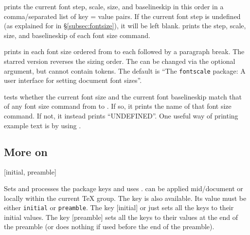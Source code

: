\documentclass{beery}
\begin{document}
\nopagebreak\newline
{}

 prints the current font step, scale, size, and baselineskip in this order in a comma\-/separated list of key = value pairs.
If the current font step is undefined (as explained for  in \S\ref{subsec:fontsize}), it will be left blank.
 prints the step, scale, size, and baselineskip of each font size command.

\nopagebreak\newline
{}

 prints  in each font size ordered from  to  each followed by a paragraph break.
The starred version  reverses the sizing order.
The  can be changed via the optional argument, but cannot contain  tokens.
The default  is \enquote{The \texttt{fontscale} package: A user interface for setting document font sizes}.

\KeepNextPar*

 tests whether the current font size and the current font baselineskip match that of any font size command from  to .
If so, it prints the name of that font size command.
If not, it instead prints \enquote{UNDEFINED\@}.
One useful way of printing example text is by using
.
\vfill%

\subsection
  {%
    \texorpdfstring
      {More on }
      {More on \textbackslash{}fontscalesetup}%
  }
\label{subsec:fontscalesetup}

\nopagebreak\newline
{}[initial, preamble]

Sets and processes the  package keys and uses .
 can be applied mid\-/document or locally within the current \TeX{} group.
The key  is also available.
Its value must be either \texttt{initial} or \texttt{preamble}.
The key [initial] or just  sets all the keys to their initial values.
The key [preamble] sets all the keys to their values at the end of the preamble (or does nothing if used before the end of the preamble).
\end{document}
